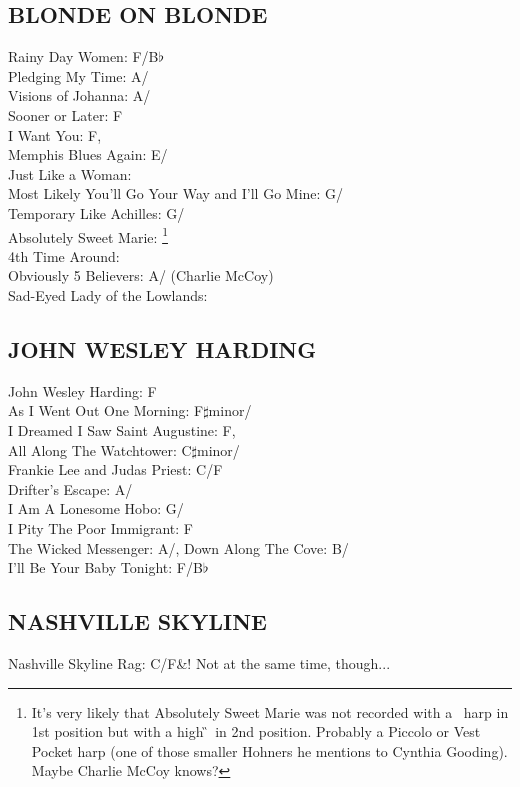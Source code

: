 \begin{articlelayout}
\subsection{BLONDE ON BLONDE}
Rainy Day Women: F/B$\flat$\\ Pledging My Time: A/\D\\ Visions of Johanna: A/\D\\ Sooner or Later: F\\ I Want You: F,\\
Memphis Blues Again: E/\A\\ Just Like a Woman: \E\\ Most Likely You'll Go Your Way and I'll Go Mine: G/\C\\ Temporary Like Achilles: G/\C\\ Absolutely Sweet Marie: \D\footnote{It's very likely that Absolutely Sweet
Marie was not recorded with a \D~harp in 1st position but with a high
\G~in 2nd position. Probably a Piccolo or Vest Pocket harp (one of
those smaller Hohners he mentions to Cynthia Gooding). Maybe
Charlie McCoy knows?}\\ 4th Time Around: \E\\ Obviously 5 Believers: A/\D
(Charlie McCoy)\\ Sad-Eyed Lady of the Lowlands: \D\\


\subsection{JOHN WESLEY HARDING}
John Wesley Harding: F\\ As I Went Out One Morning: F$\sharp$minor/\A\\ I Dreamed I Saw Saint Augustine: F,\\
All Along The Watchtower: C$\sharp$minor/\E\\ Frankie Lee and Judas Priest: C/F\\ Drifter's Escape: A/\D\\ I Am A Lonesome Hobo: G/\C\\ I Pity The  Poor Immigrant: F\\ The Wicked Messenger: A/\D,
Down Along The Cove: B/\E\\ I'll Be Your Baby Tonight: F/B$\flat$


\subsection{NASHVILLE SKYLINE}
Nashville Skyline Rag: C/F\&\C! Not at the same time, though...



\end{articlelayout}
